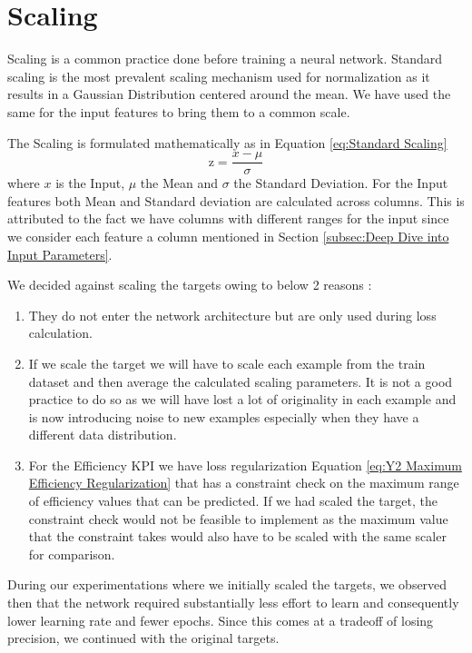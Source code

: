 \documentclass{report} %
\begin{document}
\section{Scaling}\label{sec:Scaling}

Scaling is a common practice done before training a neural network. 
Standard scaling is the most prevalent scaling mechanism used for normalization as it results in a Gaussian Distribution centered around the mean.
We have used the same for the input features to bring them to a common scale. 

The Scaling is formulated mathematically as in Equation \ref{eq:Standard Scaling}
\begin{equation}
    \text{z} = \frac{x - \mu}{\sigma}
    \label{eq:Standard Scaling}
\end{equation} 
where $x$ is the Input, $\mu$ the Mean and $\sigma$ the Standard Deviation.
For the Input features both Mean and Standard deviation are calculated across columns. 
This is attributed to the fact we have columns with different ranges for the input since we consider each feature a column mentioned in Section \ref{subsec:Deep Dive into Input Parameters}.

We decided against scaling the targets owing to below 2 reasons :
\begin{enumerate}
    \item They do not enter the network architecture but are only used during loss calculation.
    \item If we scale the target we will have to scale each example from the train dataset and then average the calculated scaling parameters.
    It is not a good practice to do so as we will have lost a lot of originality in each example and is now introducing noise to new examples especially when they have a different data distribution.
    \item For the Efficiency \ac{KPI} we have loss regularization Equation \ref{eq:Y2 Maximum Efficiency Regularization} that has a constraint 
    check on the maximum range of efficiency values that can be predicted. If we had scaled the target, the constraint check would not be feasible to 
    implement as the maximum value that the constraint takes would also have to be scaled with the same scaler for comparison.
\end{enumerate}

During our experimentations where we initially scaled the targets, we observed then that the network required substantially less effort to learn and consequently lower learning rate and fewer epochs.
Since this comes at a tradeoff of losing precision, we continued with the original targets.
\end{document}
